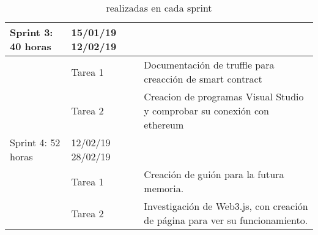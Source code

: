 \begin{table}[H]
\begin{tabular}{|p{1.5cm}|p{1.5cm}|p{5cm}}
Sprint 3: 40 horas       & 15/01/19 12/02/19           & \multicolumn{1}{p{9.2cm}|}{}                                                                                             \\ \hline
                         & Tarea 1                       & \multicolumn{1}{p{9.2cm}|}{Documentación de truffle para creacción de smart contract}                           \\ \hline
                         & Tarea 2                       & \multicolumn{1}{p{9.2cm}|}{Creacion de programas Visual Studio y comprobar su conexión con ethereum}            \\ \hline
Sprint 4: 52 horas       & 12/02/19 28/02/19           & \multicolumn{1}{l|}{}                                                                                             \\ \hline
                         & Tarea 1                       & \multicolumn{1}{p{9.2cm}|}{Creación de guión para la futura memoria.}                                                    \\ \hline
                         & Tarea 2                       & \multicolumn{1}{p{9.2cm}|}{Investigación de Web3.js, con creación de página para ver su funcionamiento.}                 \\ \hline
                         
 \end{tabular}
 \caption{realizadas en cada sprint}
\label{tabla:sprint0}
\end{table}       
         
